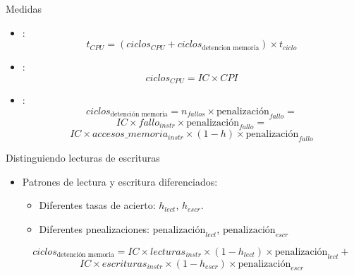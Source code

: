\begin{frame}[t]{Medidas}
\begin{itemize}
  \item {}:
\[
t_{CPU} = 
\left( ciclos_{CPU} + ciclos_{\text{detencion memoria}} \right) \times t_{ciclo}
\]

  \item {}:
\[
ciclos_{CPU} =
IC \times CPI
\]

  \item {}:
\[
ciclos_{\text{detención memoria}} =
n_{fallos} \times \text{penalización}_{fallo}=
\]
\[
IC \times fallo_{instr} \times \text{penalización}_{fallo} =
\]
\[
IC \times accesos\_memoria_{instr} \times (1 - h ) \times \text{penalización}_{fallo}
\]
\end{itemize}
\end{frame}

\begin{frame}[t]{Distinguiendo lecturas de escrituras}
\begin{itemize}
  \item Patrones de lectura y escritura diferenciados:
    \begin{itemize}
      \item Diferentes tasas de acierto: $h_{lect}$, $h_{escr}$.
      \item Diferentes pnealizaciones: $\text{penalización}_{lect}$, $\text{penalización}_{escr}$
    \end{itemize}

\[
ciclos_{\text{detención memoria}} =
IC \times lecturas_{instr} \times (1 - h_{lect}) \times \text{penalización}_{lect} +
\]
\[
IC \times escrituras_{instr} \times (1 - h_{escr}) \times \text{penalización}_{escr}
\]
\end{itemize}
\end{frame}
